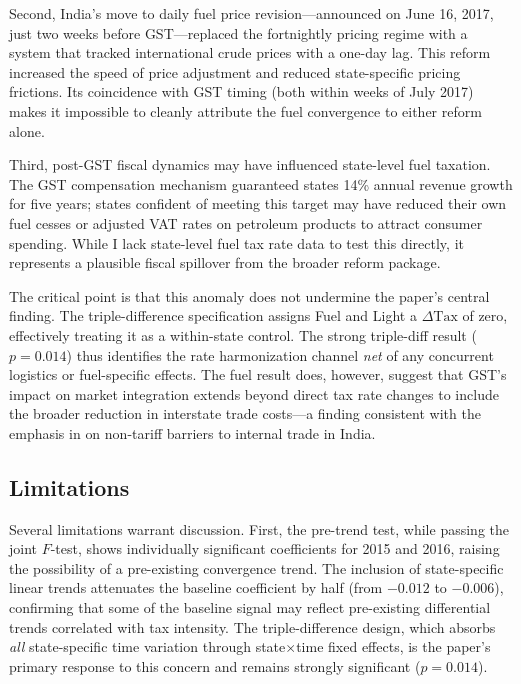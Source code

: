 \documentclass[12pt]{article}
\begin{document}
Second, India's move to daily fuel price revision---announced on June 16, 2017, just two weeks before GST---replaced the fortnightly pricing regime with a system that tracked international crude prices with a one-day lag. This reform increased the speed of price adjustment and reduced state-specific pricing frictions. Its coincidence with GST timing (both within weeks of July 2017) makes it impossible to cleanly attribute the fuel convergence to either reform alone.

Third, post-GST fiscal dynamics may have influenced state-level fuel taxation. The GST compensation mechanism guaranteed states 14\% annual revenue growth for five years; states confident of meeting this target may have reduced their own fuel cesses or adjusted VAT rates on petroleum products to attract consumer spending. While I lack state-level fuel tax rate data to test this directly, it represents a plausible fiscal spillover from the broader reform package.

The critical point is that this anomaly does not undermine the paper's central finding. The triple-difference specification assigns Fuel and Light a $\Delta\text{Tax}$ of zero, effectively treating it as a within-state control. The strong triple-diff result ($p = 0.014$) thus identifies the rate harmonization channel \textit{net} of any concurrent logistics or fuel-specific effects. The fuel result does, however, suggest that GST's impact on market integration extends beyond direct tax rate changes to include the broader reduction in interstate trade costs---a finding consistent with the emphasis in \citet{vanleemput2021nation} on non-tariff barriers to internal trade in India.

\subsection{Limitations}

Several limitations warrant discussion. First, the pre-trend test, while passing the joint $F$-test, shows individually significant coefficients for 2015 and 2016, raising the possibility of a pre-existing convergence trend. The inclusion of state-specific linear trends attenuates the baseline coefficient by half (from $-0.012$ to $-0.006$), confirming that some of the baseline signal may reflect pre-existing differential trends correlated with tax intensity. The triple-difference design, which absorbs \textit{all} state-specific time variation through state$\times$time fixed effects, is the paper's primary response to this concern and remains strongly significant ($p = 0.014$).
\end{document}
